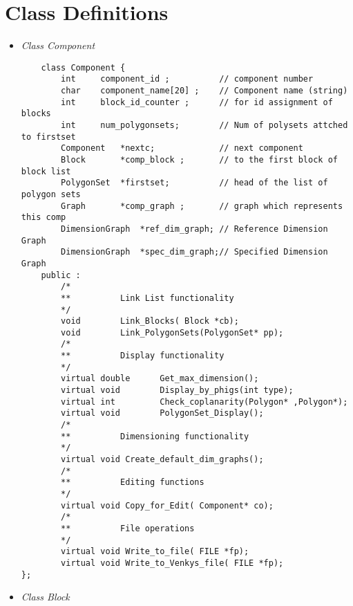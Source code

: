 	\chapter{Class Definitions} \label{appclas}

	\begin{itemize}
	\item

	{\em Class Component} \label{appcomp}
    \begin{verbatim}
    class Component {
        int     component_id ;          // component number
        char    component_name[20] ;    // Component name (string)
        int 	block_id_counter ;  	// for id assignment of blocks
        int 	num_polygonsets; 		// Num of polysets attched to firstset
        Component   *nextc;   			// next component
        Block 		*comp_block ;   	// to the first block of block list
        PolygonSet  *firstset;			// head of the list of polygon sets
        Graph   	*comp_graph ;   	// graph which represents this comp
        DimensionGraph  *ref_dim_graph; // Reference Dimension Graph
        DimensionGraph  *spec_dim_graph;// Specified Dimension Graph
    public :
        /*
        **          Link List functionality
        */
        void        Link_Blocks( Block *cb);
        void        Link_PolygonSets(PolygonSet* pp);
        /*
        **          Display functionality
        */
        virtual double      Get_max_dimension();
        virtual void        Display_by_phigs(int type);
        virtual int         Check_coplanarity(Polygon* ,Polygon*);
        virtual void        PolygonSet_Display();
        /*
        **          Dimensioning functionality
        */
        virtual void Create_default_dim_graphs();
        /*
        **          Editing functions
        */
        virtual void Copy_for_Edit( Component* co);
        /*
        **          File operations
        */
        virtual void Write_to_file( FILE *fp);
        virtual void Write_to_Venkys_file( FILE *fp);
};
	\end{verbatim}

	\item
	{\em Class Block} \label{appblk}


\end{itemize}
